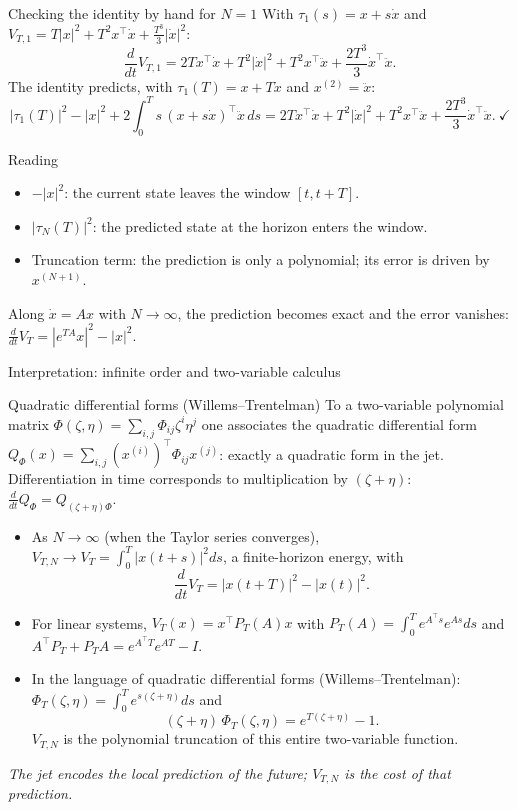\documentclass[10pt,aspectratio=169]{beamer}
\newcommand{\tr}{^{\top}}
\begin{document}
\begin{frame}{Checking the identity by hand for $N=1$}
With $\tau_1(s)=x+s\dot x$ and $V_{T,1}=T|x|^2+T^2x\tr\dot x+\frac{T^3}{3}|\dot x|^2$:
\[
\frac{d}{dt}V_{T,1}=2Tx\tr\dot x+T^2|\dot x|^2+T^2x\tr\ddot x+\frac{2T^3}{3}\dot x\tr\ddot x .
\]
The identity predicts, with $\tau_1(T)=x+T\dot x$ and $x^{(2)}=\ddot x$:
\[
|\tau_1(T)|^2-|x|^2+2\int_0^Ts\,(x+s\dot x)\tr\ddot x\,ds
=2Tx\tr\dot x+T^2|\dot x|^2+T^2x\tr\ddot x+\frac{2T^3}{3}\dot x\tr\ddot x .\ \checkmark
\]
\medskip
\begin{block}{Reading}
\begin{itemize}
\item $-|x|^2$: the current state leaves the window $[t,t+T]$.
\item $|\tau_N(T)|^2$: the predicted state at the horizon enters the window.
\item Truncation term: the prediction is only a polynomial; its error is driven by $x^{(N+1)}$.
\end{itemize}
Along $\dot x=Ax$ with $N\to\infty$, the prediction becomes exact and the error vanishes: $\frac{d}{dt}V_T=|e^{TA}x|^2-|x|^2$.
\end{block}
\end{frame}

\begin{frame}{Interpretation: infinite order and two-variable calculus}
\small\begin{block}{Quadratic differential forms (Willems--Trentelman)}
To a two-variable polynomial matrix $\Phi(\zeta,\eta)=\sum_{i,j}\Phi_{ij}\zeta^i\eta^j$ one associates the quadratic differential form $Q_\Phi(x)=\sum_{i,j}(x^{(i)})\tr\Phi_{ij}x^{(j)}$: exactly a quadratic form in the jet. Differentiation in time corresponds to multiplication by $(\zeta+\eta)$: $\frac{d}{dt}Q_\Phi=Q_{(\zeta+\eta)\Phi}$.
\end{block}
\begin{itemize}
\item As $N\to\infty$ (when the Taylor series converges), $V_{T,N}\to V_T=\int_0^T|x(t+s)|^2ds$, a finite-horizon energy, with
\[
\frac{d}{dt}V_T=|x(t+T)|^2-|x(t)|^2 .
\]
\item For linear systems, $V_T(x)=x\tr P_T(A)x$ with $P_T(A)=\int_0^Te^{A\tr s}e^{As}ds$ and $A\tr P_T+P_TA=e^{A\tr T}e^{AT}-I$.
\item In the language of quadratic differential forms (Willems--Trentelman): $\Phi_T(\zeta,\eta)=\int_0^Te^{s(\zeta+\eta)}ds$ and
\[
(\zeta+\eta)\,\Phi_T(\zeta,\eta)=e^{T(\zeta+\eta)}-1 .
\]
$V_{T,N}$ is the polynomial truncation of this entire two-variable function.
\end{itemize}
\medskip
\begin{center}
\emph{The jet encodes the local prediction of the future; $V_{T,N}$ is the cost of that prediction.}
\end{center}
\end{frame}
\end{document}
